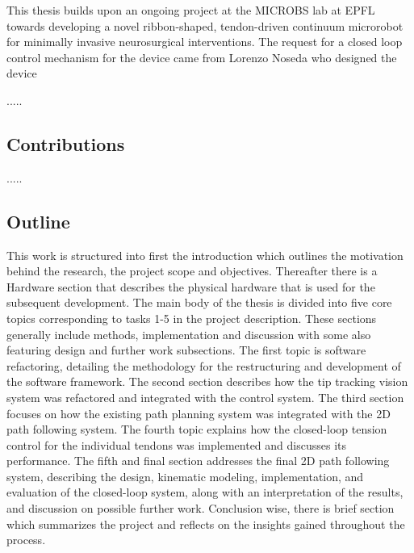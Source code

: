 This thesis builds upon an ongoing project at the MICROBS lab at EPFL towards developing a novel ribbon-shaped, tendon-driven continuum microrobot for minimally invasive neurosurgical interventions. The request for a closed loop control mechanism for the device came from Lorenzo Noseda who designed the device 

.....




\subsection{Contributions}

.....


\subsection{Outline}
This work is structured into first the introduction which outlines the motivation behind the research, the project scope and objectives. Thereafter there is a Hardware section that describes the physical hardware that is used for the subsequent development.
\newline \newline 
The main body of the thesis is divided into five core topics corresponding to tasks 1-5 in the project description. These sections generally include methods, implementation and discussion with some also featuring design and further work subsections.
\newline \newline 
The first topic is software refactoring, detailing the methodology for the restructuring and development of the software framework. The second section describes how the tip tracking vision system was refactored and integrated with the control system. The third section focuses on how the existing path planning system was integrated with the 2D path following system. The fourth topic explains how the closed-loop tension control for the individual tendons was implemented and discusses its performance. The fifth and final section addresses the final 2D path following system, describing the design, kinematic modeling, implementation, and evaluation of the closed-loop system, along with an interpretation of the results, and discussion on possible further work.
\newline \newline
Conclusion wise, there is brief section which summarizes the project and reflects on the insights gained throughout the process.


